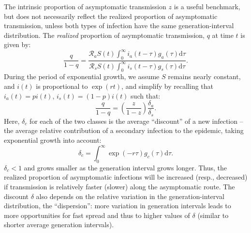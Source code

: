 \documentclass[12pt]{article}
\begin{document}
The intrinsic proportion of asymptomatic transmission $z$ is a useful benchmark, but does not necessarily reflect the realized proportion of asymptomatic transmission, unless both types of infection have the same generation-interval distribution.
The \emph{realized} proportion of asymptomatic transmission, $q$ at time $t$ is given by:
\begin{equation}
\frac{q}{1-q}=\frac{\mathcal R_a S(t) \int_0^\infty i_a(t-\tau) g_a(\tau) \mathrm{d}\tau}{\mathcal R_s S(t) \int_0^\infty i_s(t-\tau) g_s(\tau) \mathrm{d}\tau}.
\end{equation}
During the period of exponential growth, we assume $S$ remains nearly constant, and $i(t)$ is proportional to $\exp(r t)$, and simplify by recalling that $i_a(t)= p i(t)$, $i_s(t)=(1-p)i(t)$ such that: 
\begin{equation}
\frac{q}{1-q}=\left(\frac{z}{1-z}\right)\frac{\delta_a}{\delta_s}.
\label{eq.qratio}
\end{equation}
Here, $\delta_c$ for each of the two classes is the average ``discount'' of a new infection -- the average relative contribution of a secondary infection to the epidemic, taking exponential growth into account:
\begin{equation}
	\delta_c = \int_0^\infty \exp(-r\tau) g_c(\tau) \mathrm{d}\tau.
\end{equation}
$\delta_c<1$ and grows smaller as the generation interval grows longer.
Thus, the realized proportion of asymptomatic infections will be increased (resp., decreased) if transmission is relatively faster (slower) along the asymptomatic route.
The discount $\delta$ also depends on the relative variation in the generation-interval distribution, the ``dispersion'': more variation in generation intervals leads to more opportunities for fast spread and thus to higher values of $\delta$ (similar to shorter average generation intervals). 
\end{document}
